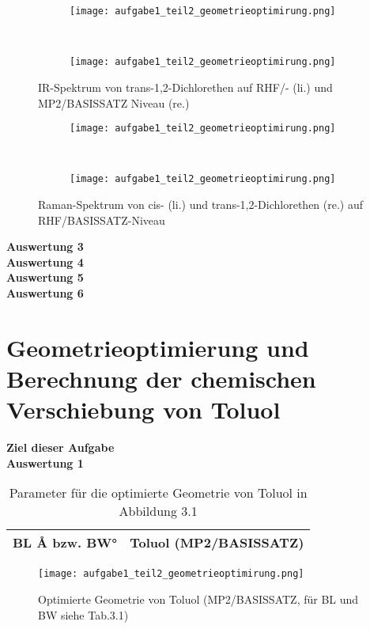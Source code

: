 \documentclass[12pt]{article}
\begin{document}
\begin{figure}[!hptb]
    \centering
    \begin{subfigure}[b]{0.4\textwidth}
        \texttt{[image: aufgabe1\_teil2\_geometrieoptimirung.png]}
    \end{subfigure}
    ~ %
    \begin{subfigure}[b]{0.4\textwidth}
        \texttt{[image: aufgabe1\_teil2\_geometrieoptimirung.png]}
    \end{subfigure}
    \caption{IR-Spektrum von trans-1,2-Dichlorethen auf RHF/- (li.) und MP2/BASISSATZ Niveau (re.)}
\end{figure}

\begin{figure}[!hptb]
    \centering
    \begin{subfigure}[b]{0.4\textwidth}
        \texttt{[image: aufgabe1\_teil2\_geometrieoptimirung.png]}
    \end{subfigure}
    ~ %
    \begin{subfigure}[b]{0.4\textwidth}
        \texttt{[image: aufgabe1\_teil2\_geometrieoptimirung.png]}
    \end{subfigure}
    \caption{Raman-Spektrum von cis- (li.) und trans-1,2-Dichlorethen (re.) auf RHF/BASISSATZ-Niveau}
\end{figure}
\newpage
\noindent
\textbf{Auswertung 3}\\
\textbf{Auswertung 4}\\
\textbf{Auswertung 5}\\
\textbf{Auswertung 6}\\
\newpage
\section{Geometrieoptimierung und Berechnung der chemischen Verschiebung von Toluol}
\noindent
\textbf{Ziel dieser Aufgabe}\\
\textbf{Auswertung 1}\\

\begin{table}[htbp]
\caption{Parameter für die optimierte Geometrie von Toluol in Abbildung 3.1}
\begin{tabular}{cc}
\toprule
BL\/ \si{\angstrom} bzw. BW\/\si{\degree} & Toluol (MP2/BASISSATZ) \\
\midrule
\bottomrule
\end{tabular}
\end{table}
\begin{figure}[!htbp]
\centering
  \texttt{[image: aufgabe1\_teil2\_geometrieoptimirung.png]}%
  \caption{Optimierte Geometrie von Toluol (MP2/BASISSATZ, für BL und BW siehe Tab.3.1)}
\end{figure}
\end{document}
